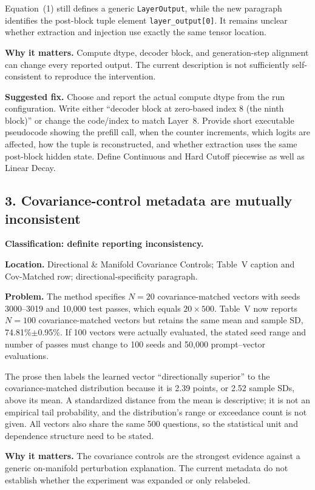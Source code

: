 \documentclass[11pt]{article}
\begin{document}
Equation~(1) still defines a generic \texttt{LayerOutput}, while the new paragraph identifies the post-block tuple element \texttt{layer\_output[0]}.  It remains unclear whether extraction and injection use exactly the same tensor location.

\textbf{Why it matters.} Compute dtype, decoder block, and generation-step alignment can change every reported output.  The current description is not sufficiently self-consistent to reproduce the intervention.

\textbf{Suggested fix.} Choose and report the actual compute dtype from the run configuration.  Write either ``decoder block at zero-based index 8 (the ninth block)'' or change the code/index to match Layer~8.  Provide short executable pseudocode showing the prefill call, when the counter increments, which logits are affected, how the tuple is reconstructed, and whether extraction uses the same post-block hidden state.  Define Continuous and Hard Cutoff piecewise as well as Linear Decay.

\subsection*{3. Covariance-control metadata are mutually inconsistent}

\textbf{Classification: definite reporting inconsistency.}

\textbf{Location.} Directional \& Manifold Covariance Controls; Table~V caption and Cov-Matched row; directional-specificity paragraph.

\textbf{Problem.} The method specifies $N=20$ covariance-matched vectors with seeds 3000--3019 and 10,000 test passes, which equals $20\times500$.  Table~V now reports $N=100$ covariance-matched vectors but retains the same mean and sample SD, 74.81\%$\pm$0.95\%.  If 100 vectors were actually evaluated, the stated seed range and number of passes must change to 100 seeds and 50,000 prompt--vector evaluations.

The prose then labels the learned vector ``directionally superior'' to the covariance-matched distribution because it is 2.39 points, or 2.52 sample SDs, above its mean.  A standardized distance from the mean is descriptive; it is not an empirical tail probability, and the distribution's range or exceedance count is not given.  All vectors also share the same 500 questions, so the statistical unit and dependence structure need to be stated.

\textbf{Why it matters.} The covariance controls are the strongest evidence against a generic on-manifold perturbation explanation.  The current metadata do not establish whether the experiment was expanded or only relabeled.
\end{document}
